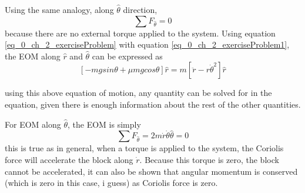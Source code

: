 Using the same analogy, along $\hat{\theta}$ direction,
\begin{equation}
	\sum F_{\hat{\theta}} = 0
\end{equation}
because there are no external torque applied to the system. Using equation \eqref{eq_0_ch_2_exerciseProblem} with equation \eqref{eq_0_ch_2_exerciseProblem1}, the EOM along $\hat{r}$ and $\hat{\theta}$ can be expressed as
\begin{equation}
	\left[   -mg sin\theta + \mu mg cos\theta \right] \hat{r} = m \left[ \ddot{r}- r \dot{\theta}^{2} \right] \hat{r} 
\end{equation}

using this above equation of motion, any quantity can be solved for in the equation, given there is enough information about the rest of the other quantities.

For EOM along $\hat{\theta}$, the EOM is simply
\begin{equation}
\sum F_{\hat{\theta}} = 2 m \dot{r} \dot{\theta} \hat{\theta} = 0
\end{equation}
this is true as in general, when a torque is applied to the system, the Coriolis force will accelerate the block along $\dot{r}$. Because this torque is zero, the block cannot be accelerated, it can also be shown that angular momentum is conserved (which is zero in this case, i guess) as Coriolis force is zero.













